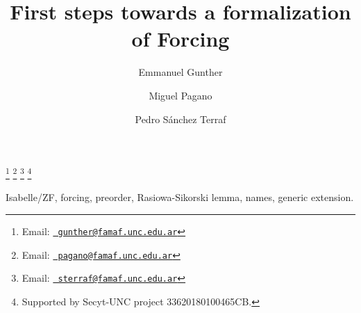 \documentclass[9pt]{entcs} \usepackage{entcsmacro}
\begin{document}
\begin{frontmatter}
  \title{First steps towards a formalization of Forcing}
  \author{Emmanuel Gunther%
    }
  \address{FaMAF\\ Universidad Nacional de C\'ordoba\\
    C\'ordoba, Argentina} \author{Miguel Pagano}
  \address{FaMAF\\Universidad Nacional de C\'ordoba\\
    C\'ordoba, Argentina}
  \author{Pedro S\'anchez Terraf}
  \address{CIEM-FaMAF\\Universidad Nacional de C\'ordoba\\
    C\'ordoba, Argentina}
 \thanks[myemail]{Email:
    \href{mailto:gunther@famaf.unc.edu.ar} {\texttt{\normalshape
        gunther@famaf.unc.edu.ar}}} \thanks[coemail]{Email:
    \href{mailto:pagano@famaf.unc.edu.ar} {\texttt{\normalshape
        pagano@famaf.unc.edu.ar}}}  \thanks[co2email]{Email:
    \href{mailto:sterraf@famaf.unc.edu.ar} {\texttt{\normalshape
        sterraf@famaf.unc.edu.ar}}} 
 \thanks[ALL]{Supported by Secyt-UNC project 33620180100465CB.} 
\begin{abstract} 
\end{abstract}
\begin{keyword}
Isabelle/ZF, forcing, preorder, Rasiowa-Sikorski lemma, names, generic extension.
\end{keyword}
\end{frontmatter}



















\end{document}
